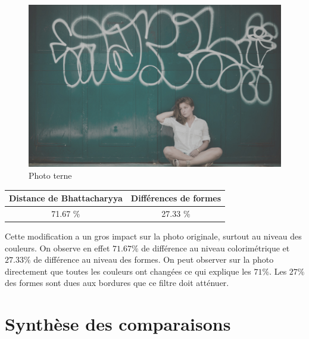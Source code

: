 \documentclass[]{article}
\begin{document}
\begin{figure}[htbp]
\centering
\includegraphics{photos/terne.jpg}
\caption{Photo terne}
\end{figure}

\begin{center}
\begin{tabular}{|c|c|}
  \hline
  Distance de Bhattacharyya & Différences de formes \\
  \hline
  71.67 \% & 27.33 \% \\
  \hline
\end{tabular}
\end{center}

Cette modification a un gros impact sur la photo originale, surtout au
niveau des couleurs. On observe en effet $71.67 \%$ de différence au
niveau colorimétrique et $27.33 \%$ de différence au niveau des formes.
On peut observer sur la photo directement que toutes les couleurs ont
changées ce qui explique les $71 \%$. Les $27 \%$ des formes sont dues aux
bordures que ce filtre doit atténuer.

\newpage

\section{Synthèse des comparaisons}\label{synthese-des-comparaisons}
\end{document}
